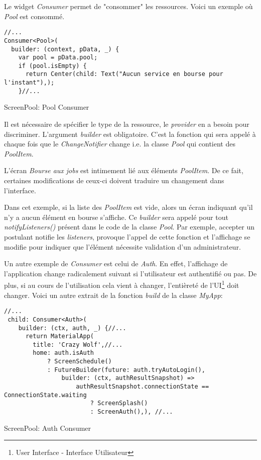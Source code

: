 Le widget \textit{Consumer} permet de "consommer" les ressources. Voici un exemple où \textit{Pool} est consommé. 

\begin{listing}[!h]
\begin{verbatim}
//...
Consumer<Pool>(
  builder: (context, pData, _) {
    var pool = pData.pool;
    if (pool.isEmpty) {
      return Center(child: Text("Aucun service en bourse pour l'instant"),);
    }//...
\end{verbatim}
\caption{ScreenPool: Pool Consumer}
\label{code:poolConsumer}
\end{listing}

Il est nécessaire de spécifier le type de la ressource, le \textit{provider} en a besoin pour discriminer. L'argument \textit{builder} est obligatoire. C'est la fonction qui sera appelé à chaque fois que le \textit{ChangeNotifier} change i.e. la classe \textit{Pool} qui contient des \textit{PoolItem}. 

L'écran \textit{Bourse aux jobs} est intimement lié aux éléments \textit{PoolItem}. De ce fait, certaines modifications de ceux-ci doivent traduire un changement dans l'interface. 

Dans cet exemple, si la liste des \textit{PoolItem} est vide, alors un écran indiquant qu'il n'y a aucun élément en bourse s'affiche. Ce \textit{builder} sera appelé pour tout \textit{notifyListeners()} présent dans le code de la classe \textit{Pool}. Par exemple, accepter un postulant notifie les \textit{listeners}, provoque l'appel de cette fonction et l'affichage se modifie pour indiquer que l'élément nécessite validation d'un administrateur.

Un autre exemple de \textit{Consumer} est celui de \textit{Auth}. En effet, l'affichage de l'application change radicalement suivant si l'utilisateur est authentifié ou pas. De plus, si au cours de l'utilisation cela vient à changer, l'entièreté de l'UI\footnote{User Interface - Interface Utilisateur} doit changer. Voici un autre extrait de la fonction \textit{build} de la classe \textit{MyApp}:

\begin{listing}[!h]
\begin{verbatim}
//...
 child: Consumer<Auth>(
    builder: (ctx, auth, _) {//...
      return MaterialApp(
        title: 'Crazy Wolf',//...
        home: auth.isAuth
            ? ScreenSchedule()
            : FutureBuilder(future: auth.tryAutoLogin(),
                builder: (ctx, authResultSnapshot) =>
                    authResultSnapshot.connectionState == ConnectionState.waiting
                        ? ScreenSplash()
                        : ScreenAuth(),), //...
\end{verbatim}
\caption{ScreenPool: Auth Consumer}
\label{code:authConsumer}
\end{listing}

